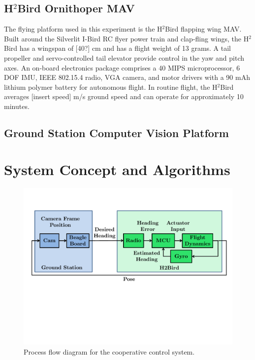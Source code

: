 \documentclass{aamas2013}
\begin{document}
\subsection{H$^2$Bird Ornithoper MAV}
The flying platform used in this experiment is the H$^2$Bird flapping wing 
MAV. Built around the Silverlit I-Bird RC flyer power train and clap-fling 
wings, the H$^2$Bird has a wingspan of [40?] cm and has a flight weight of 
13 grams. A tail propeller and servo-controlled tail elevator provide 
control in the yaw and pitch axes. An on-board electronics package comprises 
a 40 MIPS microprocessor, 6 DOF IMU, IEEE 802.15.4 radio, VGA camera, and motor 
drivers with a 90 mAh lithium polymer battery for autonomous flight. In 
routine flight, the H$^2$Bird averages [insert speed] m/s ground speed and 
can operate for approximately 10 minutes.


\subsection{Ground Station Computer Vision Platform}


\section{System Concept and Algorithms}

\begin{figure}[tb]
\centering
\includegraphics[width=\linewidth]{figures/process_flow.pdf}
\caption{Process flow diagram for the cooperative control system.}
\label{fig:process_flow}
\end{figure}
\end{document}
